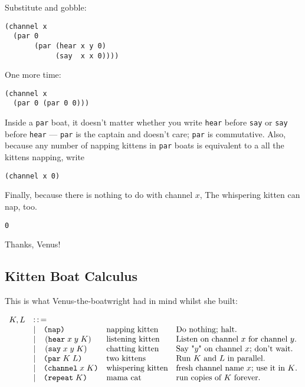 \documentclass[10pt,oneside,x11names]{article}
\newcommand{\Coloneqq}{\mathrel{\vcenter{\hbox{$:\,:\,=$}}{}}}
\theoremstyle{definition}
\theoremstyle{warning}
\newcommand\say [3]{\left(\texttt{say}\thickspace{}#1\thickspace{}#2\thickspace{}#3\right)}
\newcommand\hear[3]{\left(\texttt{hear}\thickspace{}#1\thickspace{}#2\thickspace{}#3\right)}
\newcommand\knapping    [0]{\texttt{(nap)}}
\newcommand\kpar        [2]{\texttt{(par}\thickspace{}#1\thickspace{}#2\texttt{)}}
\newcommand\kwhispering [2]{\texttt{(channel}\thickspace{}#1\thickspace{}#2\texttt{)}}
\newcommand\kmama       [1]{\texttt{(repeat}\thickspace{}#1\texttt{)}}
\begin{document}
Substitute and gobble:

\vskip 0.26cm
\begin{verbatim}
(channel x
  (par 0
       (par (hear x y 0)
            (say  x x 0))))
\end{verbatim}

One more time:

\vskip 0.26cm
\begin{verbatim}
(channel x
  (par 0 (par 0 0)))
\end{verbatim}

\newpage
Inside a \texttt{par} boat, it doesn't matter whether you write
\texttt{hear} before \texttt{say} or \texttt{say} before \texttt{hear} --- \texttt{par} is the
captain and doesn't care; \texttt{par} is commutative. Also, because
any number of napping kittens in \texttt{par} boats is equivalent to
a all the kittens napping, write

\vskip 0.26cm
\begin{verbatim}
(channel x 0)
\end{verbatim}

Finally, because there is nothing to do with channel \(x\), The
whispering kitten can nap, too.

\vskip 0.26cm
\begin{verbatim}
0
\end{verbatim}

Thanks, Venus!

\newpage
\subsection{Kitten Boat Calculus}
\label{sec:org445b939}

This is what Venus-the-boatwright had in mind whilst she built:

\begin{equation}
\begin{array}{clll}
  K, L & \Coloneqq \\
       & | \quad \knapping            & \textrm{napping kitten}    & \textrm{Do nothing; halt.}                                   \\
       & | \quad \hear{x}{y}{K}       & \textrm{listening kitten}  & \textrm{Listen on channel }x\textrm{ for channel }y.         \\
       & | \quad \say{x}{y}{K}        & \textrm{chatting kitten}   & \textrm{Say "}y\textrm{" on channel }x\textrm{; don't wait.} \\
       & | \quad \kpar{K}{L}          & \textrm{two kittens}       & \textrm{Run }K\textrm{ and }L\textrm{ in parallel.}          \\
       & | \quad \kwhispering{x}{K}   & \textrm{whispering kitten} & \textrm{fresh channel name }x\textrm{; use it in }K\textrm{.}\\
       & | \quad \kmama{K}            & \textrm{mama cat}          & \textrm{run copies of }K\textrm{ forever}\textrm{.}          \\
\end{array}
\end{equation}
\end{document}
